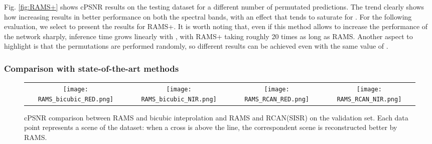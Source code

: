 \documentclass[journal]{IEEEtran}
\begin{document}
Fig. \ref{fig:RAMS+} shows cPSNR results on the testing dataset for a different number of permutated predictions. The trend clearly shows how increasing  results in better performance on both the spectral bands, with an effect that tends to saturate for . For the following evaluation, we select  to present the results for RAMS+. It is worth noting that, even if this method allows to increase the performance of the network sharply, inference time grows linearly with , with RAMS+ taking roughly 20 times as long as RAMS. Another aspect to highlight is that the permutations are performed randomly, so different results can be achieved even with the same value of .


\subsubsection{Comparison with state-of-the-art methods}
\begin{figure*}[h]
\centering
\begin{tabular}{cccc}
 \texttt{[image: RAMS\_bicubic\_RED.png]}
&\texttt{[image: RAMS\_bicubic\_NIR.png]}
&\texttt{[image: RAMS\_RCAN\_RED.png]}
&\texttt{[image: RAMS\_RCAN\_NIR.png]}
\end{tabular}
\caption{cPSNR comparison between RAMS and bicubic inteprolation and RAMS and RCAN(SISR) on the validation set. Each data point represents a scene of the dataset: when a cross is above the line, the correspondent scene is reconstructed better by RAMS.}
\label{fig:RAMS_comparison}
\end{figure*}
\end{document}
